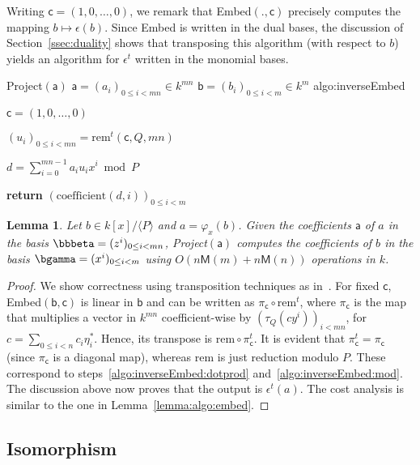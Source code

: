 \documentclass{sig-alternate}
\def\M {\ensuremath{\mathsf{M}}}
\def\va {\ensuremath{\mathsf{a}}}
\def\vb {\ensuremath{\mathsf{b}}}
\def\vc {\ensuremath{\mathsf{c}}}
\def\rem {\ensuremath{\mathrm{rem}}}
\def\coeff {\ensuremath{\mathrm{coefficient}}}
\newcounter{algo}
\newenvironment{algorithm_endline}[4]{\small\begin{center}\begin{minipage}{0.48\textwidth}
      \refstepcounter{algo}
      \label{#4}
      \sf
      \rule{\textwidth}{0.2pt}\\
      \makebox[\textwidth][c]{Algorithm~\arabic{algo}:~\textbf{#1}}\\
      \rule[0.5\baselineskip]{\textwidth}{0.2pt}\\

      \vspace{-12pt}

      \parbox{\textwidth}{\textbf{Input} #2}
      \parbox{\textwidth}{\textbf{Output} #3}

\vspace{-7pt}

      \begin{enumerate*}}{\end{enumerate*}
      \vspace{-11pt}
      \rule{\textwidth}{0.2pt}
\end{minipage}\end{center}
}
\newcommand{\ang}[1]{\langle#1\rangle}
\newtheorem{Lemma}{Lemma}
\begin{document}
Writing $\vc=(1,0,\dots,0)$, we remark that {\sf Embed}$(.,\vc)$ precisely
computes the mapping $b\mapsto \epsilon(b)$. Since {\sf Embed} is written in
the dual bases, the discussion of Section~\ref{ssec:duality} shows
that transposing this algorithm (with respect to $b$) yields an
algorithm for $\epsilon^t$ written in the monomial bases. 

\vspace{-5pt}

\begin{algorithm_endline}
{Project$(\va)$}
{$\va=(a_i)_{0 \le i < mn} \in k^{mn}$}
{$\vb=(b_i)_{0 \le i < m} \in k^m$}
{algo:inverseEmbed}
\item $\vc=(1,0,\dots,0)$ 
\item  $(u_i)_{0\le i<mn} = \rem^t(\vc,Q,mn)$
\item \label{algo:inverseEmbed:dotprod} $d = \sum_{i=0}^{mn-1} a_i u_i x^i  \bmod P$
\item {\bf return} \label{algo:inverseEmbed:mod} $(\coeff(d,i))_{0 \le i < m}$
\end{algorithm_endline}

\begin{Lemma}\label{lemma:project}
  Let $b \in k[x]/\ang{P}$ and $a=\varphi_x(b)$. Given the
  coefficients $\va$ of $a$ in the basis $\bbbeta=(z^i)_{0 \le i
    < mn}$, {\sf Project}$(\va)$ computes the coefficients of $b$ in
  the basis $\bgamma=(x^i)_{0 \le i < m}$ using $O(n\M(m) + n\M(n))$
  operations in $k$.
\end{Lemma}
\begin{proof}
  We show correctness using transposition techniques as
  in~\cite{bostan+lecerf+schost:tellegen}. For fixed $\vc$,
  Embed$(\vb,\vc)$ is linear in $\vb$ and can be written as
  $\pi_\vc\circ\rem^t$, where $\pi_\vc$ is the map that multiplies a
  vector in $k^{mn}$ coefficient-wise by $(\tau_Q(c y^i))_{i<mn}$, for
  $c=\sum_{0 \le i < n} c_i \eta^\ast_i$.  Hence, its transpose is
  $\rem\circ\pi_\vc^t$. It is evident that $\pi_\vc^t=\pi_\vc$ (since
  $\pi_\vc$ is a diagonal map), whereas $\rem$ is just reduction
  modulo $P$. These correspond to
  steps~\ref{algo:inverseEmbed:dotprod}
  and~\ref{algo:inverseEmbed:mod}. The discussion above now proves
  that the output is $\epsilon^t(a)$. The cost analysis is similar to
  the one in Lemma~\ref{lemma:algo:embed}.
\end{proof}


\subsection{Isomorphism} 
\end{document}
